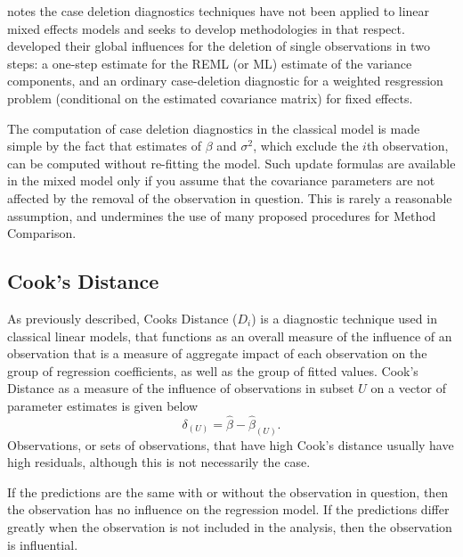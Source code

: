 \documentclass[12pt, a4paper]{report}
\theoremstyle{plain}
\theoremstyle{definition}
\theoremstyle{remark}
\begin{document}
\citet{Christensen} notes the case deletion diagnostics techniques have not been applied to linear mixed effects models and seeks to develop methodologies in that respect. \citet{Christensen} developed their global influences for the deletion of single observations in two steps: a one-step estimate for the REML (or ML) estimate of the variance components, and an ordinary case-deletion diagnostic for a weighted resgression problem (conditional on the estimated covariance matrix) for fixed effects.

The computation of case deletion diagnostics in the classical model is made simple by the fact that estimates of $\beta$ and $\sigma^2$, which exclude the $i$th observation, can be computed without re-fitting the model. Such update formulas are available in the mixed model only if you assume that the covariance parameters are not affected by the removal of the observation in question. This is rarely a reasonable assumption, and undermines the use of many proposed procedures for Method Comparison.

	\subsection{Cook's Distance}
As previously described,  Cooks Distance ($D_{i}$) is a diagnostic technique used in classical linear models, that functions as an overall measure of the influence of an observation that is a measure of aggregate impact of each observation on the group of regression coefficients, as well as the group of fitted values.  Cook's Distance as a measure of the influence of observations in subset $U$ on a vector of parameter estimates is given below \citep{cook77}
	\[ \delta_{(U)} = \hat{\beta} - \hat{\beta}_{(U)}.\]
	Observations, or sets of observations, that have high Cook's distance usually have high residuals, although this is not necessarily the case.
	
	
	If the predictions are the same with or without the observation in question, then the observation has no influence on the regression model. If the predictions differ greatly when the observation is not included in the analysis, then the observation is influential.
	
	
\end{document}
